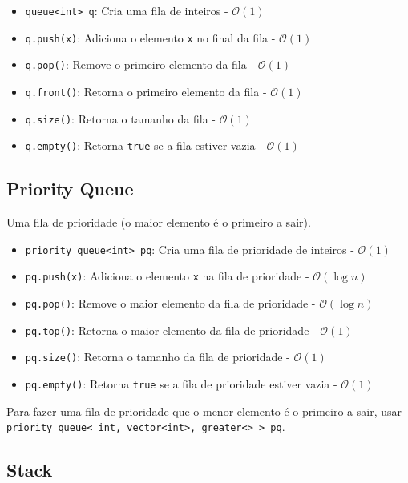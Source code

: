 \begin{itemize}
    \item \texttt{queue<int> q}: Cria uma fila de inteiros - $\mathcal{O}(1)$
    \item \texttt{q.push(x)}: Adiciona o elemento \texttt{x} no final da fila - $\mathcal{O}(1)$
    \item \texttt{q.pop()}: Remove o primeiro elemento da fila - $\mathcal{O}(1)$
    \item \texttt{q.front()}: Retorna o primeiro elemento da fila - $\mathcal{O}(1)$
    \item \texttt{q.size()}: Retorna o tamanho da fila - $\mathcal{O}(1)$
    \item \texttt{q.empty()}: Retorna \texttt{true} se a fila estiver vazia - $\mathcal{O}(1)$
\end{itemize}

\subsection{Priority Queue}

Uma fila de prioridade (o maior elemento é o primeiro a sair).

\begin{itemize}
    \item \texttt{priority\_queue<int> pq}: Cria uma fila de prioridade de inteiros - $\mathcal{O}(1)$
    \item \texttt{pq.push(x)}: Adiciona o elemento \texttt{x} na fila de prioridade - $\mathcal{O}(\log n)$
    \item \texttt{pq.pop()}: Remove o maior elemento da fila de prioridade - $\mathcal{O}(\log n)$
    \item \texttt{pq.top()}: Retorna o maior elemento da fila de prioridade - $\mathcal{O}(1)$
    \item \texttt{pq.size()}: Retorna o tamanho da fila de prioridade - $\mathcal{O}(1)$
    \item \texttt{pq.empty()}: Retorna \texttt{true} se a fila de prioridade estiver vazia - $\mathcal{O}(1)$
\end{itemize}

Para fazer uma fila de prioridade que o menor elemento é o primeiro a sair, usar \texttt{priority\_queue< int, vector<int>, greater<> > pq}.

\subsection{Stack}

